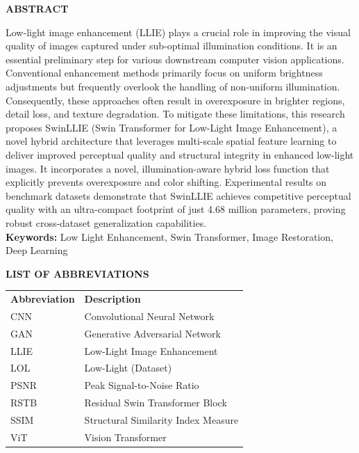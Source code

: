 \documentclass[12pt, a4paper]{report}
\begin{document}
\clearpage
{}
\begin{center}
    \textbf{ABSTRACT}
\end{center}
\vspace{0.3in}
\noindent Low-light image enhancement (LLIE) plays a crucial role in improving the visual quality of images captured under sub-optimal illumination conditions. It is an essential preliminary step for various downstream computer vision applications. Conventional enhancement methods primarily focus on uniform brightness adjustments but frequently overlook the handling of non-uniform illumination. Consequently, these approaches often result in overexposure in brighter regions, detail loss, and texture degradation. To mitigate these limitations, this research proposes SwinLLIE (Swin Transformer for Low-Light Image Enhancement), a novel hybrid architecture that leverages multi-scale spatial feature learning to deliver improved perceptual quality and structural integrity in enhanced low-light images. It incorporates a novel, illumination-aware hybrid loss function that explicitly prevents overexposure and color shifting. Experimental results on benchmark datasets demonstrate that SwinLLIE achieves competitive perceptual quality with an ultra-compact footprint of just 4.68 million parameters, proving robust cross-dataset generalization capabilities.\\[0.3in]
\textbf{Keywords:} Low Light Enhancement, Swin Transformer, Image Restoration, Deep Learning

\clearpage
\tableofcontents

\clearpage
{}
\listoffigures

\vspace{1.5in}
\listoftables

\clearpage
{}
\begin{center}
    \textbf{LIST OF ABBREVIATIONS}
\end{center}
\vspace{0.3in}
\noindent
\begin{tabular}{@{}p{1.5in}l@{}}
\textbf{Abbreviation} & \textbf{Description} \\[0.2in]
CNN & Convolutional Neural Network \\
GAN & Generative Adversarial Network \\
LLIE & Low-Light Image Enhancement \\
LOL & Low-Light (Dataset) \\
PSNR & Peak Signal-to-Noise Ratio \\
RSTB & Residual Swin Transformer Block \\
SSIM & Structural Similarity Index Measure \\
ViT & Vision Transformer \\
\end{tabular}
\end{document}

